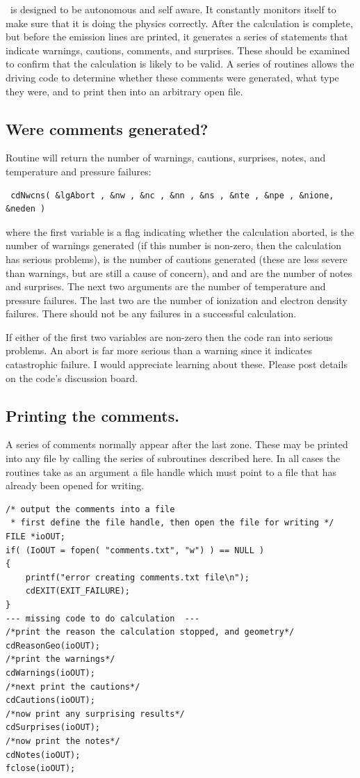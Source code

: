 \Cloudy\ is designed to be autonomous and self aware.
It constantly
monitors itself to make sure that it is doing the physics correctly.  After
the calculation is complete, but before the emission lines are printed,
it generates a series of statements that indicate warnings, cautions,
comments, and surprises.
These should be examined to confirm that the
calculation is likely to be valid.
A series of routines allows the driving
code to determine whether these comments were generated, what type they
were, and to print then into an arbitrary open file.

\subsection{Were comments generated?}

Routine  will return the number of warnings, cautions, surprises,
notes, and temperature and pressure failures:
\begin{verbatim}
 cdNwcns( &lgAbort , &nw , &nc , &nn , &ns , &nte , &npe , &nione, &neden )
\end{verbatim}
where the first variable is a  flag indicating whether the calculation
aborted,  is the number of warnings generated (if this number is non-zero,
then the calculation has serious problems),  is the number of cautions
generated (these are less severe than warnings, but are still a cause of
concern), and  and  are the number of notes and surprises.
The next
two arguments are the number of temperature and pressure failures.
The
last two are the number of ionization and electron density failures.  There
should not be any failures in a successful calculation.

If either of the first two variables are non-zero then the code ran into
serious problems.  An abort is far more serious than a warning since it
indicates catastrophic failure.  I would appreciate learning about these.
Please post details on the code's discussion board.

\subsection{Printing the comments.}

A series of comments normally appear after the last zone.  These may
be printed into any file by calling the series of subroutines described
here.  In all cases the routines take as an argument a file handle which
must point to a file that has already been opened for writing.
\begin{verbatim}
/* output the comments into a file
 * first define the file handle, then open the file for writing */
FILE *ioOUT;
if( (IoOUT = fopen( "comments.txt", "w") ) == NULL )
{
    printf("error creating comments.txt file\n");
    cdEXIT(EXIT_FAILURE);
}
--- missing code to do calculation  ---
/*print the reason the calculation stopped, and geometry*/
cdReasonGeo(ioOUT);
/*print the warnings*/
cdWarnings(ioOUT);
/*next print the cautions*/
cdCautions(ioOUT);
/*now print any surprising results*/
cdSurprises(ioOUT);
/*now print the notes*/
cdNotes(ioOUT);
fclose(ioOUT);
\end{verbatim}

